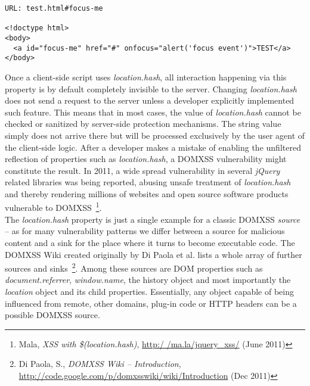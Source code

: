 \begin{lstlisting}[label=lst:focusing-element-with-hash,caption=Example for a URL equipped with a location hash value causing a DOM node to be focused,captionpos=b]
URL: test.html#focus-me

<!doctype html>
<body>
  <a id="focus-me" href="#" onfocus="alert('focus event')">TEST</a>
</body>
\end{lstlisting}

    Once a client-side script uses \textit{location.hash}, all interaction happening via this property is by default completely invisible to the server. Changing \textit{location.hash} does not send a request to the server unless a developer explicitly implemented such feature. This means that in most cases, the value of \textit{location.hash} cannot be checked or sanitized by server-side protection mechanisms. The string value simply does not arrive there but will be processed exclusively by the user agent of the client-side logic. After a developer makes a mistake of enabling the unfiltered reflection of properties such as \textit{location.hash}, a DOMXSS vulnerability might constitute the result. In 2011, a wide spread vulnerability in several \textit{jQuery} related libraries was being reported, abusing unsafe treatment of \textit{location.hash} and thereby rendering millions of websites and open source software products vulnerable to DOMXSS~\footnote{Mala, \textit{XSS with \$(location.hash)}, \url{http:/
/ma.la/jquery_xss/} (June 2011)}. \\

    The \textit{location.hash} property is just a single example for a classic DOMXSS \textit{source} -- as for many vulnerability patterns we differ between a source for malicious content and a sink for the place where it turns to become executable code. The DOMXSS Wiki created originally by Di Paola et al. lists a whole array of further sources and sinks~\footnote{Di Paola, S., \textit{DOMXSS Wiki -- Introduction}, \url{http://code.google.com/p/domxsswiki/wiki/Introduction} (Dec 2011)}. Among these sources are DOM properties such as \textit{document.referrer}, \textit{window.name}, the history object and most importantly the \textit{location} object and its child properties. Essentially, any object capable of being influenced from remote, other domains, plug-in code or HTTP headers can be a possible DOMXSS source. \\

